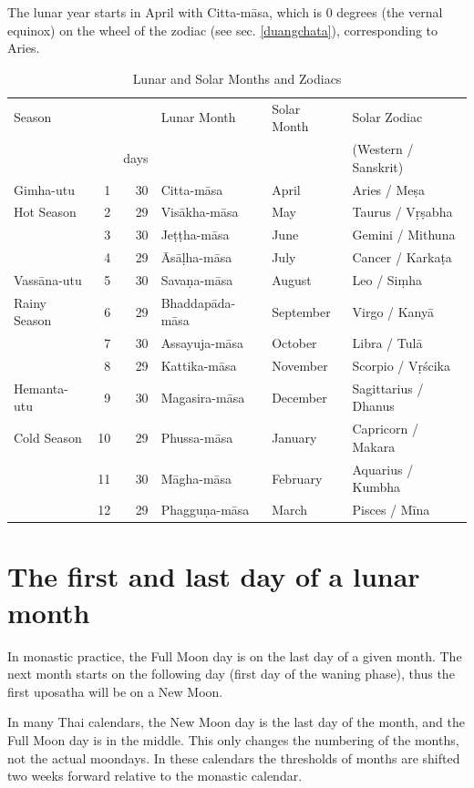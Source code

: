 \documentclass[11pt,oneside]{memoir-article}
\begin{document}
The lunar year starts in April with Citta-māsa, which is 0 degrees (the vernal
equinox) on the wheel of the zodiac (see sec. \ref{duangchata}), corresponding
to Aries.

\begin{table}[h]
\caption{\label{tbl-month-names} Lunar and Solar Months and Zodiacs\autocite{hasapannyo-zodiac}}
\centering
\begin{tabular}{lrrlll}
Season &  &  & Lunar Month & Solar Month & Solar Zodiac\\
 &  & days &  &  & (Western / Sanskrit)\\
\hline
Gimha-utu & 1 & 30 & Citta-māsa & April & Aries / Meṣa\\
Hot Season & 2 & 29 & Visākha-māsa & May & Taurus / Vṛṣabha\\
 & 3 & 30 & Jeṭṭha-māsa & June & Gemini / Mithuna\\
 & 4 & 29 & Āsāḷha-māsa & July & Cancer / Karkaṭa\\
\hline
Vassāna-utu & 5 & 30 & Savaṇa-māsa & August & Leo / Siṃha\\
Rainy Season & 6 & 29 & Bhaddapāda-māsa & September & Virgo / Kanyā\\
 & 7 & 30 & Assayuja-māsa & October & Libra / Tulā\\
 & 8 & 29 & Kattika-māsa & November & Scorpio / Vṛścika\\
\hline
Hemanta-utu & 9 & 30 & Magasira-māsa & December & Sagittarius / Dhanus\\
Cold Season & 10 & 29 & Phussa-māsa & January & Capricorn / Makara\\
 & 11 & 30 & Māgha-māsa & February & Aquarius / Kumbha\\
 & 12 & 29 & Phagguṇa-māsa & March & Pisces / Mīna\\
\end{tabular}
\end{table}

\section{The first and last day of a lunar month}
\label{sec-3-2}
\label{lunar-month-first-last}

In monastic practice, the Full Moon day is on the last day of a given
month. The next month starts on the following day (first day of the
waning phase), thus the first uposatha will be on a New Moon.

In many Thai calendars, the New Moon day is the last day of the month,
and the Full Moon day is in the middle. This only changes the
numbering of the months, not the actual moondays. In these calendars
the thresholds of months are shifted two weeks forward relative to the
monastic calendar.
\end{document}
